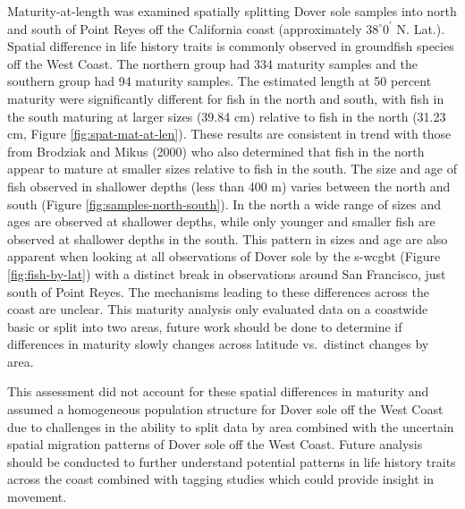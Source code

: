 \documentclass[11pt,
  english,
  a4paper,
]{article}
\begin{document}

Maturity-at-length was examined spatially splitting Dover sole samples into north and south of Point Reyes off the California coast (approximately {\(38^\circ 0^\prime\)\leavevmode\tagmcend\tagstructend} N. Lat.). Spatial difference in life history traits is commonly observed in groundfish species off the West Coast. The northern group had 334 maturity samples and the southern group had 94 maturity samples. The estimated length at 50 percent maturity were significantly different for fish in the north and south, with fish in the south maturing at larger sizes (39.84 cm) relative to fish in the north (31.23 cm, Figure \ref{fig:spat-mat-at-len}). These results are consistent in trend with those from Brodziak and Mikus {(2000)\leavevmode\tagmcend\tagstructend} who also determined that fish in the north appear to mature at smaller sizes relative to fish in the south. The size and age of fish observed in shallower depths (less than 400 m) varies between the north and south (Figure \ref{fig:samples-north-south}). In the north a wide range of sizes and ages are observed at shallower depths, while only younger and smaller fish are observed at shallower depths in the south. This pattern in sizes and age are also apparent when looking at all observations of Dover sole by the \gls{s-wcgbt} (Figure \ref{fig:fish-by-lat}) with a distinct break in observations around San Francisco, just south of Point Reyes. The mechanisms leading to these differences across the coast are unclear. This maturity analysis only evaluated data on a coastwide basic or split into two areas, future work should be done to determine if differences in maturity slowly changes across latitude vs.~distinct changes by area.

\leavevmode\tagmcend\tagstructend\par


This assessment did not account for these spatial differences in maturity and assumed a homogeneous population structure for Dover sole off the West Coast due to challenges in the ability to split data by area combined with the uncertain spatial migration patterns of Dover sole off the West Coast. Future analysis should be conducted to further understand potential patterns in life history traits across the coast combined with tagging studies which could provide insight in movement.
\end{document}
